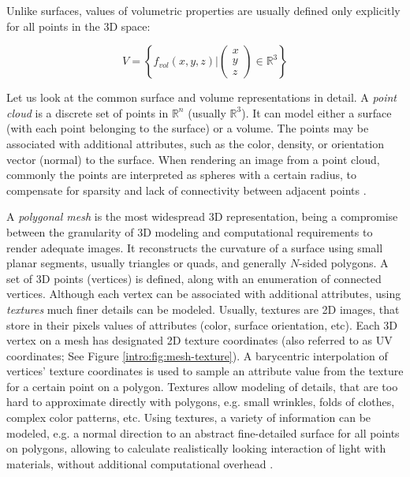 Unlike surfaces, values of volumetric properties are usually defined only explicitly for all points in the 3D space:

\begin{equation}
	\renewcommand\arraystretch{0.6}
	V = \left\{ f_{vol}(x,y,z)  \Bigg\rvert \begin{pmatrix} x \\ y \\ z \end{pmatrix} \in \mathbb{R}^3 \right\}
\end{equation}
  

Let us look at the common surface and volume representations in detail. A \textit{point cloud} is a discrete set of points in $\mathbb{R}^n$ (usually $\mathbb{R}^3$). It can model either a surface (with each point belonging to the surface) or a volume. The points may be associated with additional attributes, such as the color, density, or orientation vector (normal) to the surface. When rendering an image from a point cloud, commonly the points are interpreted as spheres with a certain radius, to compensate for sparsity and lack of connectivity between adjacent points \cite{aux:pointcloud21}.

A \textit{polygonal mesh} is the most widespread 3D representation, being a compromise between the granularity of 3D modeling and computational requirements to render adequate images. It reconstructs the curvature of a surface using small planar segments, usually triangles or quads, and generally $N$-sided polygons. A set of 3D points (vertices) is defined, along with an enumeration of connected vertices. Although each vertex can be associated with additional attributes, using \textit{textures} much finer details can be modeled. Usually, textures are 2D images, that store in their pixels values of attributes (color, surface orientation, etc). Each 3D vertex on a mesh has designated 2D texture coordinates (also referred to as UV coordinates; See Figure \ref{intro:fig:mesh-texture}). A barycentric interpolation of vertices' texture coordinates is used to sample an attribute value from the texture for a certain point on a polygon. Textures allow modeling of details, that are too hard to approximate directly with polygons, e.g. small wrinkles, folds of clothes, complex color patterns, etc. Using textures, a variety of information can be modeled, e.g. a normal direction to an abstract fine-detailed surface for all points on polygons, allowing to calculate realistically looking interaction of light with materials, without additional computational overhead \cite{aux:normal-mapping78}. 

